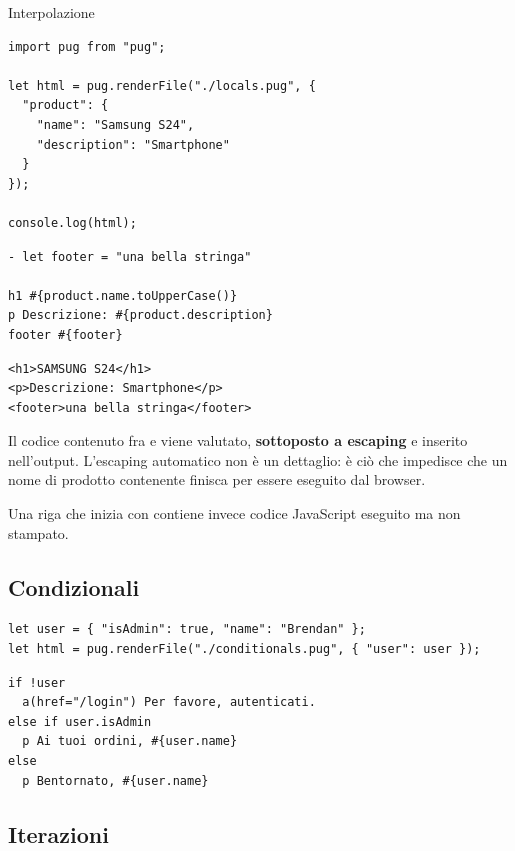 \begin{esempio}{Interpolazione}
\begin{lstlisting}[style=js]
import pug from "pug";

let html = pug.renderFile("./locals.pug", {
  "product": {
    "name": "Samsung S24",
    "description": "Smartphone"
  }
});

console.log(html);
\end{lstlisting}

\begin{lstlisting}[style=pug, name=locals.pug]
- let footer = "una bella stringa"

h1 #{product.name.toUpperCase()}
p Descrizione: #{product.description}
footer #{footer}
\end{lstlisting}

\begin{lstlisting}[style=html, name=output.html]
<h1>SAMSUNG S24</h1>
<p>Descrizione: Smartphone</p>
<footer>una bella stringa</footer>
\end{lstlisting}

Il codice contenuto fra \code{\#\{} e \code{\}} viene valutato,
\textbf{sottoposto a escaping} e inserito nell'output. L'escaping automatico
non è un dettaglio: è ciò che impedisce che un nome di prodotto contenente
 finisca per essere eseguito dal browser.

Una riga che inizia con \code{-} contiene invece codice JavaScript eseguito ma
non stampato.
\end{esempio}

\subsection{Condizionali}

\begin{lstlisting}[style=js]
let user = { "isAdmin": true, "name": "Brendan" };
let html = pug.renderFile("./conditionals.pug", { "user": user });
\end{lstlisting}

\begin{lstlisting}[style=pug, name=conditionals.pug]
if !user
  a(href="/login") Per favore, autenticati.
else if user.isAdmin
  p Ai tuoi ordini, #{user.name}
else
  p Bentornato, #{user.name}
\end{lstlisting}

\subsection{Iterazioni}

